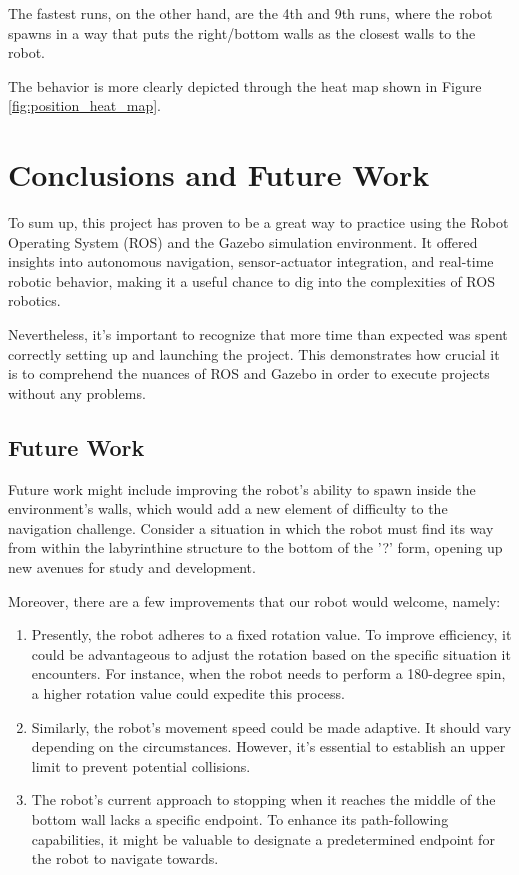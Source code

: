 \documentclass[conference]{IEEEtran}
\begin{document}
The fastest runs, on the other hand, are the 4th and 9th runs, where the robot spawns in a way that puts the right/bottom walls as the closest walls to the robot.

The behavior is more clearly depicted through the heat map shown in Figure \ref{fig:position_heat_map}.

\section{Conclusions and Future Work}

To sum up, this project has proven to be a great way to practice using the Robot Operating System (ROS) and the Gazebo simulation environment. It offered insights into autonomous navigation, sensor-actuator integration, and real-time robotic behavior, making it a useful chance to dig into the complexities of ROS robotics.

Nevertheless, it's important to recognize that more time than expected was spent correctly setting up and launching the project. This demonstrates how crucial it is to comprehend the nuances of ROS and Gazebo in order to execute projects without any problems. 

\subsection{Future Work}
Future work might include improving the robot's ability to spawn inside the environment's walls, which would add a new element of difficulty to the navigation challenge. Consider a situation in which the robot must find its way from within the labyrinthine structure to the bottom of the '?' form, opening up new avenues for study and development.

Moreover, there are a few improvements that our robot would welcome, namely:
\begin{enumerate}
    \item Presently, the robot adheres to a fixed rotation value. To improve efficiency, it could be advantageous to adjust the rotation based on the specific situation it encounters. For instance, when the robot needs to perform a 180-degree spin, a higher rotation value could expedite this process.
    \item Similarly, the robot's movement speed could be made adaptive. It should vary depending on the circumstances. However, it's essential to establish an upper limit to prevent potential collisions.
    \item The robot's current approach to stopping when it reaches the middle of the bottom wall lacks a specific endpoint. To enhance its path-following capabilities, it might be valuable to designate a predetermined endpoint for the robot to navigate towards. 
\end{enumerate}
\end{document}
